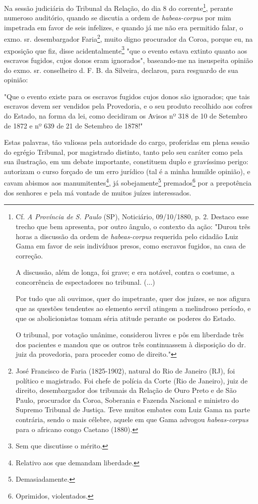 Na sessão judiciária do Tribunal da Relação, do dia 8 do
corrente\footnote{Cf. \emph{A Província de S. Paulo} (SP), Noticiário,
  09/10/1880, p. 2. Destaco esse trecho que bem apresenta, por outro
  ângulo, o contexto da ação: "Durou três horas a discussão da ordem de
  \emph{habeas-corpus} requerida pelo cidadão Luiz Gama em favor de seis
  indivíduos presos, como escravos fugidos, na casa de correção.

  A discussão, além de longa, foi grave; e era notável, contra o
  costume, a concorrência de espectadores no tribunal. (...)

  Por tudo que ali ouvimos, quer do impetrante, quer dos juízes, se nos
  afigura que as questões tendentes ao elemento servil atingem a
  melindroso período, e que os abolicionistas tomam séria atitude
  perante os poderes do Estado.

  O tribunal, por votação unânime, considerou livres e pôs em liberdade
  três dos pacientes e mandou que os outros três continuassem à
  disposição do dr. juiz da provedoria, para proceder como de direito."},
perante numeroso auditório, quando se discutia a ordem de
\emph{habeas-corpus} por mim impetrada em favor de seis infelizes, e
quando já me não era permitido falar, o exmo. sr. desembargador
Faria\footnote{José Francisco de Faria (1825-1902), natural do Rio de
  Janeiro (RJ), foi político e magistrado. Foi chefe de polícia da Corte
  (Rio de Janeiro), juiz de direito, desembargador dos tribunais da
  Relação de Ouro Preto e de São Paulo, procurador da Coroa, Soberania e
  Fazenda Nacional e ministro do Supremo Tribunal de Justiça. Teve
  muitos embates com Luiz Gama na parte contrária, sendo o mais célebre,
  aquele em que Gama advogou \emph{habeas-corpus} para o africano congo
  Caetano (1880).}, muito digno procurador da Coroa, porque eu, na
exposição que fiz, disse acidentalmente\footnote{Sem que discutisse o
  mérito.} "que o evento estava extinto quanto aos escravos fugidos,
cujos donos eram ignorados", baseando-me na insuspeita opinião do exmo.
sr. conselheiro d. F. B. da Silveira, declarou, para resguardo de sua
opinião:

"Que o evento existe para os escravos fugidos cujos donos são ignorados;
que tais escravos devem ser vendidos pela Provedoria, e o seu produto
recolhido aos cofres do Estado, na forma da lei, como decidiram os
Avisos nº 318 de 10 de Setembro de 1872 e nº 639 de 21 de Setembro de
1878!"

Estas palavras, tão valiosas pela autoridade do cargo, proferidas em
plena sessão do egrégio Tribunal, por magistrado distinto, tanto pelo
seu caráter como pela sua ilustração, em um debate importante,
constituem duplo e gravíssimo perigo: autorizam o curso forçado de um
erro jurídico (tal é a minha humilde opinião), e cavam abismos aos
manumitentes\footnote{Relativo aos que demandam liberdade.}, já
sobejamente\footnote{Demasiadamente.} premados\footnote{Oprimidos,
  violentados.} por a
prepotência dos senhores e pela má vontade de muitos juízes
interessados.

